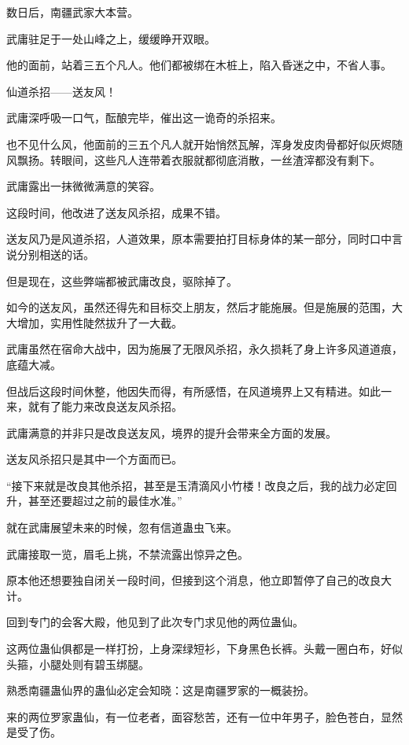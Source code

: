 
\begin{this_body}

数日后，南疆武家大本营。

武庸驻足于一处山峰之上，缓缓睁开双眼。

他的面前，站着三五个凡人。他们都被绑在木桩上，陷入昏迷之中，不省人事。

仙道杀招——送友风！

武庸深呼吸一口气，酝酿完毕，催出这一诡奇的杀招来。

也不见什么风，他面前的三五个凡人就开始悄然瓦解，浑身发皮肉骨都好似灰烬随风飘扬。转眼间，这些凡人连带着衣服就都彻底消散，一丝渣滓都没有剩下。

武庸露出一抹微微满意的笑容。

这段时间，他改进了送友风杀招，成果不错。

送友风乃是风道杀招，人道效果，原本需要拍打目标身体的某一部分，同时口中言说分别相送的话。

但是现在，这些弊端都被武庸改良，驱除掉了。

如今的送友风，虽然还得先和目标交上朋友，然后才能施展。但是施展的范围，大大增加，实用性陡然拔升了一大截。

武庸虽然在宿命大战中，因为施展了无限风杀招，永久损耗了身上许多风道道痕，底蕴大减。

但战后这段时间休整，他因失而得，有所感悟，在风道境界上又有精进。如此一来，就有了能力来改良送友风杀招。

武庸满意的并非只是改良送友风，境界的提升会带来全方面的发展。

送友风杀招只是其中一个方面而已。

“接下来就是改良其他杀招，甚至是玉清滴风小竹楼！改良之后，我的战力必定回升，甚至还要超过之前的最佳水准。”

就在武庸展望未来的时候，忽有信道蛊虫飞来。

武庸接取一览，眉毛上挑，不禁流露出惊异之色。

原本他还想要独自闭关一段时间，但接到这个消息，他立即暂停了自己的改良大计。

回到专门的会客大殿，他见到了此次专门求见他的两位蛊仙。

这两位蛊仙俱都是一样打扮，上身深绿短衫，下身黑色长裤。头戴一圈白布，好似头箍，小腿处则有碧玉绑腿。

熟悉南疆蛊仙界的蛊仙必定会知晓：这是南疆罗家的一概装扮。

来的两位罗家蛊仙，有一位老者，面容愁苦，还有一位中年男子，脸色苍白，显然是受了伤。


\end{this_body}
